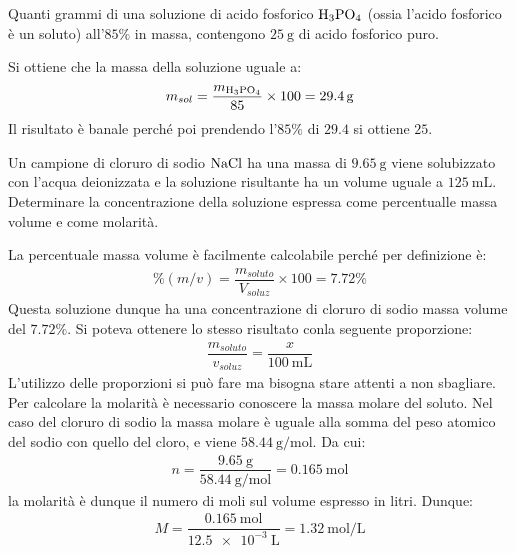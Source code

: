 \documentclass[../AppuntiChimica]{subfiles}
\begin{document}
	\begin{exe}
		Quanti grammi di una soluzione di acido fosforico $ \text{H}_{3}\text{PO}_{4} $ (ossia l'acido fosforico è un soluto) all'$ 85\% $ in massa, contengono $ \SI{25}{\gram} $ di acido fosforico puro.
	\end{exe}
	\begin{svol}
		Si ottiene che la massa della soluzione  uguale a:
		\begin{gather*}
		m_{sol}=\dfrac{m_{\text{H}_{3}\text{PO}_{4}}}{85}\times 100 = \SI{29.4}{\gram}
		\end{gather*}
		Il risultato è banale perché poi prendendo l'$ 85\% $ di $ 29.4 $ si ottiene $ 25 $.
	\end{svol}
	\begin{exe}
		Un campione di cloruro di sodio $ \text{NaCl} $ ha una massa di $ \SI{9.65}{\gram} $ viene solubizzato con l'acqua deionizzata e la soluzione risultante ha un volume uguale a $ \SI{125}{\milli\liter} $. Determinare la concentrazione della soluzione espressa come percentualle massa volume e come molarità.
	\end{exe}
	\begin{svol}
		La percentuale massa volume è facilmente calcolabile perché per definizione è:
		\begin{gather*}
		\%(m/v)=\dfrac{m_{soluto}}{V_{soluz}}\times 100=7.72\%
		\end{gather*}
		Questa soluzione dunque ha una concentrazione di cloruro di sodio massa volume del $ 7.72\% $. Si poteva ottenere lo stesso risultato conla seguente proporzione:
		\begin{gather*}
		\dfrac{m_{soluto}}{v_{soluz}}=\dfrac{x}{\SI{100}{\milli\liter}}
		\end{gather*}
		L'utilizzo delle proporzioni si può fare ma bisogna stare attenti a non sbagliare. Per calcolare la molarità è necessario conoscere la massa molare del soluto. Nel caso del cloruro di sodio la massa molare è uguale alla somma del peso atomico del sodio con quello del cloro, e viene $ \SI{58.44}{\gram\per\mole} $. Da cui:
		\begin{gather*}
		n=\dfrac{\SI{9.65}{\gram}}{\SI{58.44}{\gram\per\mole}}=\SI{0.165}{\mole}
		\end{gather*}
		la molarità è dunque il numero  di moli sul volume espresso in litri. Dunque:
		\begin{gather*}
		M=\dfrac{\SI{0.165}{\mole}}{\SI{12.5e-3}{\liter}}=\SI{1.32}{\mole\per\liter}
		\end{gather*}
	\end{svol}
\end{document}
